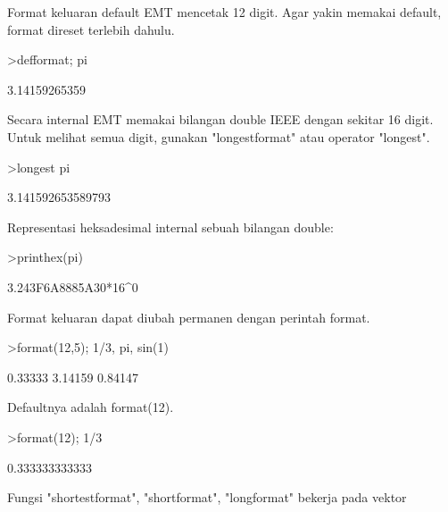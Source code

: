 \documentclass[a4paper,10pt]{article}
\begin{document}
\begin{eulernotebook}
\begin{eulercomment}
\end{eulercomment}
\begin{eulercomment}
Format keluaran default EMT mencetak 12 digit. Agar yakin memakai default,
format direset terlebih dahulu.
\end{eulercomment}
\begin{eulerprompt}
>defformat; pi
\end{eulerprompt}
\begin{euleroutput}
  3.14159265359
\end{euleroutput}
\begin{eulercomment}
Secara internal EMT memakai bilangan double IEEE dengan sekitar 16 digit.
Untuk melihat semua digit, gunakan "longestformat" atau operator "longest".
\end{eulercomment}
\begin{eulerprompt}
>longest pi
\end{eulerprompt}
\begin{euleroutput}
        3.141592653589793 
\end{euleroutput}
\begin{eulercomment}
Representasi heksadesimal internal sebuah bilangan double:
\end{eulercomment}
\begin{eulerprompt}
>printhex(pi)
\end{eulerprompt}
\begin{euleroutput}
  3.243F6A8885A30*16^0
\end{euleroutput}
\begin{eulercomment}
Format keluaran dapat diubah permanen dengan perintah format.
\end{eulercomment}
\begin{eulerprompt}
>format(12,5); 1/3, pi, sin(1)
\end{eulerprompt}
\begin{euleroutput}
      0.33333 
      3.14159 
      0.84147 
\end{euleroutput}
\begin{eulercomment}
Defaultnya adalah format(12).
\end{eulercomment}
\begin{eulerprompt}
>format(12); 1/3
\end{eulerprompt}
\begin{euleroutput}
       0.333333333333 
\end{euleroutput}
\begin{eulercomment}
Fungsi "shortestformat", "shortformat", "longformat" bekerja pada vektor

\end{eulercomment}
\end{eulernotebook}
\end{document}
